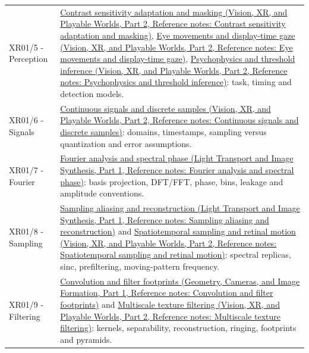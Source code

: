 {\begin{longtable}[]{@{}
  >{\raggedright\arraybackslash}p{}
  >{\raggedright\arraybackslash}p{}@{}}
XR01/5 - Perception & \href{../07-Vision-XR-and-Playable-Worlds-P02/main.pdf\#nameddest=appendix-b3aa9e8e01ad}{Contrast sensitivity adaptation and masking (Vision, XR, and Playable Worlds, Part 2, Reference notes: Contrast sensitivity adaptation and masking)}, \href{../07-Vision-XR-and-Playable-Worlds-P02/main.pdf\#nameddest=appendix-a6f2c4fe1996}{Eye movements and display-time gaze (Vision, XR, and Playable Worlds, Part 2, Reference notes: Eye movements and display-time gaze)}, \href{../07-Vision-XR-and-Playable-Worlds-P02/main.pdf\#nameddest=appendix-1759f03e8ce7}{Psychophysics and threshold inference (Vision, XR, and Playable Worlds, Part 2, Reference notes: Psychophysics and threshold inference)}: task, timing and detection models. \\
XR01/6 - Signals & \href{../07-Vision-XR-and-Playable-Worlds-P02/main.pdf\#nameddest=appendix-1077ea8fc737}{Continuous signals and discrete samples (Vision, XR, and Playable Worlds, Part 2, Reference notes: Continuous signals and discrete samples)}: domains, timestamps, sampling versus quantization and error assumptions. \\
XR01/7 - Fourier & \href{../04-Light-Transport-and-Image-Synthesis-P01/main.pdf\#nameddest=appendix-b60686ba06a1}{Fourier analysis and spectral phase (Light Transport and Image Synthesis, Part 1, Reference notes: Fourier analysis and spectral phase)}: basis projection, DFT/FFT, phase, bins, leakage and amplitude conventions. \\
XR01/8 - Sampling & \href{../04-Light-Transport-and-Image-Synthesis-P01/main.pdf\#nameddest=appendix-6a7869dd79a6}{Sampling aliasing and reconstruction (Light Transport and Image Synthesis, Part 1, Reference notes: Sampling aliasing and reconstruction)} and \href{../07-Vision-XR-and-Playable-Worlds-P02/main.pdf\#nameddest=appendix-70895739febb}{Spatiotemporal sampling and retinal motion (Vision, XR, and Playable Worlds, Part 2, Reference notes: Spatiotemporal sampling and retinal motion)}: spectral replicas, sinc, prefiltering, moving-pattern frequency. \\
XR01/9 - Filtering & \href{../03-Geometry-Cameras-and-Image-Formation-P01/main.pdf\#nameddest=appendix-d5b3c692d9f0}{Convolution and filter footprints (Geometry, Cameras, and Image Formation, Part 1, Reference notes: Convolution and filter footprints)} and \href{../07-Vision-XR-and-Playable-Worlds-P02/main.pdf\#nameddest=appendix-b677a85ba76f}{Multiscale texture filtering (Vision, XR, and Playable Worlds, Part 2, Reference notes: Multiscale texture filtering)}: kernels, separability, reconstruction, ringing, footprints and pyramids. \\

\end{longtable}}
